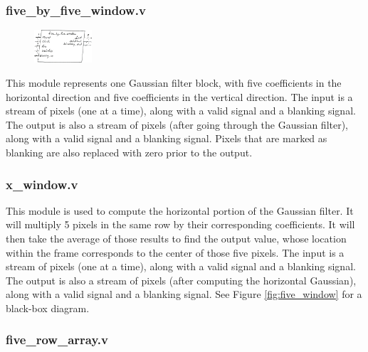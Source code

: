 \documentclass[12pt]{article}
\begin{document}
\subsubsection{five\_by\_five\_window.v}

\begin{figure}
    \includegraphics[width=0.19\textwidth]{processed_image_pngs/black_box_modules/five_by_five_window_blackbox.png}
\end{figure}

This module represents one Gaussian filter block, with five coefficients in the 
horizontal direction and five coefficients in the vertical direction. The input 
is a stream of pixels (one at a time), along with a valid signal and a blanking 
signal. The output is also a stream of pixels (after going through the Gaussian 
filter), along with a valid signal and a blanking signal. Pixels that are 
marked as blanking are also replaced with zero prior to the output.

\subsubsection{x\_window.v}


This module is used to compute the horizontal portion of the Gaussian filter. 
It will multiply 5 pixels in the same row by their corresponding coefficients. 
It will then take the average of those results to find the output value, whose 
location within the frame corresponds to the center of those five pixels. The 
input is a stream of pixels (one at a time), along with a valid signal and a 
blanking signal. The output is also a stream of pixels (after computing the 
horizontal Gaussian), along with a valid signal and a blanking signal. See Figure \ref{fig:five_window} for a 
black-box diagram.

\subsubsection{five\_row\_array.v}
\end{document}
